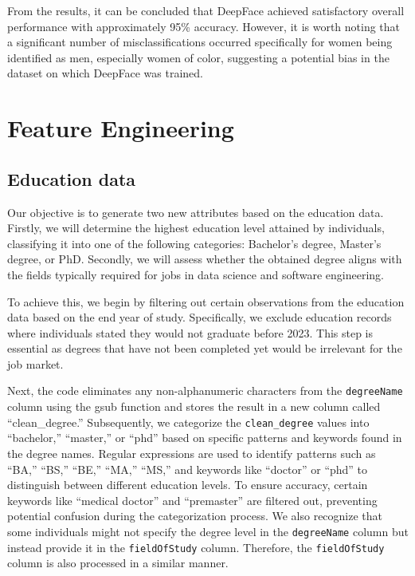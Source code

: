 \documentclass[11pt,]{article}
\begin{document}
From the results, it can be concluded that DeepFace achieved
satisfactory overall performance with approximately 95\% accuracy.
However, it is worth noting that a significant number of
misclassifications occurred specifically for women being identified as
men, especially women of color, suggesting a potential bias in the
dataset on which DeepFace was trained.

\hypertarget{feature-engineering}{%
\section{Feature Engineering}\label{feature-engineering}}

\hypertarget{education-data}{%
\subsection{Education data}\label{education-data}}

Our objective is to generate two new attributes based on the education
data. Firstly, we will determine the highest education level attained by
individuals, classifying it into one of the following categories:
Bachelor's degree, Master's degree, or PhD. Secondly, we will assess
whether the obtained degree aligns with the fields typically required
for jobs in data science and software engineering.

To achieve this, we begin by filtering out certain observations from the
education data based on the end year of study. Specifically, we exclude
education records where individuals stated they would not graduate
before 2023. This step is essential as degrees that have not been
completed yet would be irrelevant for the job market.

Next, the code eliminates any non-alphanumeric characters from the
\texttt{degreeName} column using the gsub function and stores the result
in a new column called ``clean\_degree.'' Subsequently, we categorize
the \texttt{clean\_degree} values into ``bachelor,'' ``master,'' or
``phd'' based on specific patterns and keywords found in the degree
names. Regular expressions are used to identify patterns such as ``BA,''
``BS,'' ``BE,'' ``MA,'' ``MS,'' and keywords like ``doctor'' or ``phd''
to distinguish between different education levels. To ensure accuracy,
certain keywords like ``medical doctor'' and ``premaster'' are filtered
out, preventing potential confusion during the categorization process.
We also recognize that some individuals might not specify the degree
level in the \texttt{degreeName} column but instead provide it in the
\texttt{fieldOfStudy} column. Therefore, the \texttt{fieldOfStudy}
column is also processed in a similar manner.
\end{document}
